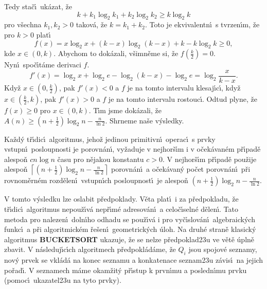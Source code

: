 \flushpar Tedy sta\v c\'\i\ uk\'azat, \v ze 
$$k+k_1\log_2k_1+k_2\log_2k_2\ge k\log_2k$$
pro v\v sechna $k_1,k_2>0$ takov\'a, \v ze $k=k_1+k_2$. Toto je 
ekvivalentn\'\i\ s tvrzen\'\i m, \v ze pro $k>0$ plat\'\i\ 
$$f\left(x\right)=x\log_2x+\left(k-x\right)\log_2\left(k-x\right)+k-k\log_2k\ge 0,$$
kde $x\in \left(0,k\right)$. 
Abychom to dok\'azali, v\v simn\v eme si, \v ze $f\left(\frac k2\right)=0$. Nyn\'\i\ 
spo\v c\'\i\-t\'ame derivaci $f$.
$$f'\left(x\right)=\log_2x+\log_2e-\log_2\left(k-x\right)-\log_2e=\log_2\frac x{k-x}.$$
Kdy\v z $x\in \left(0,\frac k2\right)$, pak $f'\left(x\right)<0$ a $f$ je na tomto intervalu 
klesaj\'\i c\'\i , kdy\v z $x\in \left(\frac k2,k\right)$, pak $f'\left(x\right)>0$ a $
f$ je na tomto 
intervalu rostouc\'\i . Odtud plyne, \v ze $f\left(x\right)\ge 0$ pro $x\in 
\left(0,k\right)$.
T\'\i m jsme dok\'azali, \v ze $A\left(n\right)\ge \left(n+\frac 12\right)\log_2n-\frac 
n{\ln2}$. Shrneme 
na\v se v\'ysledky.
\medskip

Ka\v zd\'y t\v r\'\i dic\'\i\ algoritmus, jeho\v z jedinou 
primitivn\'\i\ ope\-rac\'\i\ s prvky vstupn\'\i\ posloupnosti je 
porovn\'an\'\i , vy\v zaduje v nej\-hor\v s\'\i m i v o\v cek\'avan\'em p\v r\'\i pad\v e 
alespo\v n $cn\log n$ \v casu pro n\v eja\-kou konstantu $c>0$.  V 
nejhor\v s\'\i m p\v r\'\i pad\v e pou\v zije alespo\v n $\left\lceil 
\left(n+\frac 12\right)\log_2n-\frac n{\ln2}\right\rceil$ 
porovn\'an\'\i\ a o\v cek\'avan\'y po\v cet porovn\'an\'\i\ p\v ri rovnom\v ern\'em 
rozd\v elen\'\i\ vstupn\'\i ch posloupnost\'\i\ je alespo\v n 
$\left(n+\frac 12\right)\log_2n-\frac n{\ln2}$.  
\endproclaim

\flushpar V tomto v\'ysledku lze oslabit p\v redpoklady. V\v eta 
plat\'\i\ i za 
p\v red\-pokladu, \v ze t\v r\'\i dic\'\i\ algoritmus nepou\v z\'\i v\'a nep\v r\'\i m\'e 
adreso\-v\'an\'\i\ a celo\-\v c\'\i seln\'e d\v elen\'\i . Tato metoda pro 
nalezen\'\i\ doln\'\i ho odhadu se pou\v z\'\i v\'a i pro vy\v c\'\i slov\'an\'\i\ 
algebraick\'ych funkc\'\i\ a p\v ri algoritmick\'em \v re\v sen\'\i\ 
geometrick\'ych \'uloh. Na druh\'e stran\v e klasick\'y algoritmus 
{\bf BUCKETSORT} ukazuje, \v ze se nelze p\v red\-poklad\accent23u 
ve v\v et\v e \'upln\v e zbavit. V n\'asleduj\'\i c\'\i ch algoritmech 
p\v red\-po\-kl\'a\-d\'ame, \v ze $Q_i$ jsou spojov\'e seznamy, nov\'y 
prvek se vkl\'ad\'a na konec seznamu a konkatenace 
seznam\accent23u z\'avis\'\i\ na jejich po\v rad\'\i . V 
seznamech m\'ame okam\v zit\'y p\v r\'\i stup k prvn\'\i mu a posledn\'\i mu 
prvku (pomoc\'\i\ ukazatel\accent23u na tyto prvky).
\bigskip

